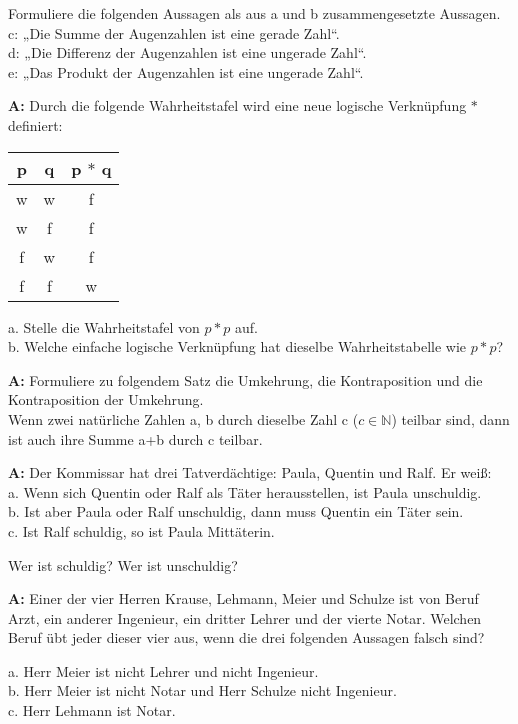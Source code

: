 \documentclass[landscape,twocolumn,a4paper]{article}
\begin{document}
Formuliere die folgenden Aussagen als aus a und b zusammengesetzte Aussagen. \\
c: „Die Summe der Augenzahlen ist eine gerade Zahl“. \\
d: „Die Differenz der Augenzahlen ist eine ungerade Zahl“. \\
e: „Das Produkt der Augenzahlen ist eine ungerade Zahl“.
\bigskip {}


 
\textbf{A:} 
Durch die folgende Wahrheitstafel wird eine neue logische Verknüpfung $*$ definiert:

\begin{tabular}{|c|c||c|}
\hline   p & q & p $*$ q  \\
\hline w  & w & f  \\
\hline w  & f & f  \\
\hline f & w & f \\
\hline f & f & w \\
\hline
\end{tabular}

a. Stelle die Wahrheitstafel von $p * p$ auf. \\
b. Welche einfache logische Verknüpfung hat dieselbe Wahrheitstabelle wie $p * p$?
\bigskip {}

\textbf{A:} 
Formuliere zu folgendem Satz die Umkehrung, die Kontraposition und die Kontraposition der Umkehrung. \\
Wenn zwei natürliche Zahlen a, b durch dieselbe Zahl c ($c\in\mathbb{N}$) teilbar sind, dann ist auch ihre Summe a+b durch c teilbar.
\bigskip {}

\textbf{A:} 
Der Kommissar hat drei Tatverdächtige: Paula, Quentin und Ralf. Er weiß: \\
a. Wenn sich Quentin oder Ralf als Täter herausstellen, ist Paula unschuldig. \\
b. Ist aber Paula oder Ralf unschuldig, dann muss Quentin ein Täter sein. \\
c. Ist Ralf schuldig, so ist Paula Mittäterin.

Wer ist schuldig? Wer ist unschuldig?
\bigskip {}

\textbf{A:} 
Einer der vier Herren Krause, Lehmann, Meier und Schulze ist von Beruf Arzt, ein anderer Ingenieur, ein dritter Lehrer und der vierte Notar. Welchen Beruf übt jeder dieser vier aus, wenn die drei folgenden Aussagen falsch sind?

a. Herr Meier ist nicht Lehrer und nicht Ingenieur. \\
b. Herr Meier ist nicht Notar und Herr Schulze nicht Ingenieur. \\
c. Herr Lehmann ist Notar.
\bigskip {}
\end{document}
